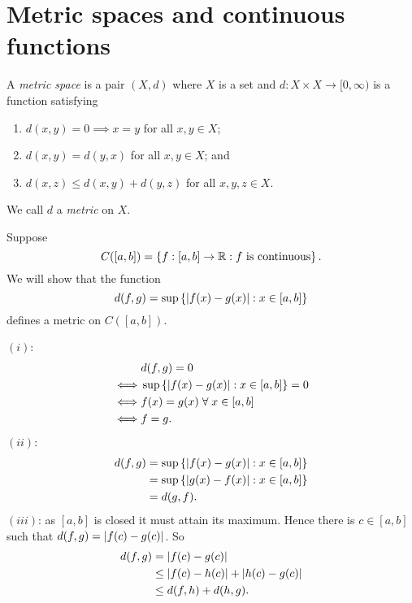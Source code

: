 
\section{Metric spaces and continuous functions}

\begin{definition}
	A \emph{metric space} is a pair $(X,d)$ where $X$ is a set and
	$d: X \times X \to [0, \infty)$ is a function satisfying
	\begin{enumerate}
		\item $d(x,y) = 0 \implies x = y$ for all $x,y \in X$;
		\item $d(x,y) = d(y,x)$ for all $x,y \in X$; and
		\item $d(x,z) \leq d(x,y) + d(y,z)$ for all $x,y,z \in X$.
	\end{enumerate}
	We call $d$ a \emph{metric} on $X$.
\end{definition}

\begin{example}[]
	Suppose \[
		C([a,b]) = \left\{ f:[a,b] \to \mathbb{R}: \text{$f$ is continuous} \right\}.
	\]
	We will show that the function \[
		d(f,g) = \sup\left\{ \left\lvert f(x) - g(x) \right\rvert: x \in [a,b] \right\}
	\]
	defines a metric on $C([a,b])$.
	
	$(i)$:
	\begin{align*}
		    & d(f,g) = 0 \\
		\iff& \sup\left\{ \left\lvert f(x) - g(x) \right\rvert: x \in [a,b] \right\} = 0 \\
		\iff& f(x) = g(x) \;\forall\; x \in [a,b] \\
		\iff& f = g.
	\end{align*}
	$(ii)$:
	\begin{align*}
		d(f,g) &= \sup\left\{ \left\lvert f(x) - g(x) \right\rvert : x \in [a,b] \right\} \\
			   &= \sup\left\{ \left\lvert g(x) - f(x) \right\rvert : x \in [a,b] \right\} \\
			   &= d(g,f).
	\end{align*}
	$(iii)$: as $[a,b]$ is closed it must attain its maximum.
	Hence there is $c \in [a,b]$ such that $d(f,g) = \left\lvert f(c) - g(c) \right\rvert$.
	So
	\begin{align*}
		d(f,g) &=    \left\lvert f(c) - g(c) \right\rvert \\
			   &\leq \left\lvert f(c) - h(c) \right\rvert + \left\lvert h(c) - g(c) \right\rvert \\
			   &\leq d(f,h) + d(h,g).
	\end{align*}
\end{example}

